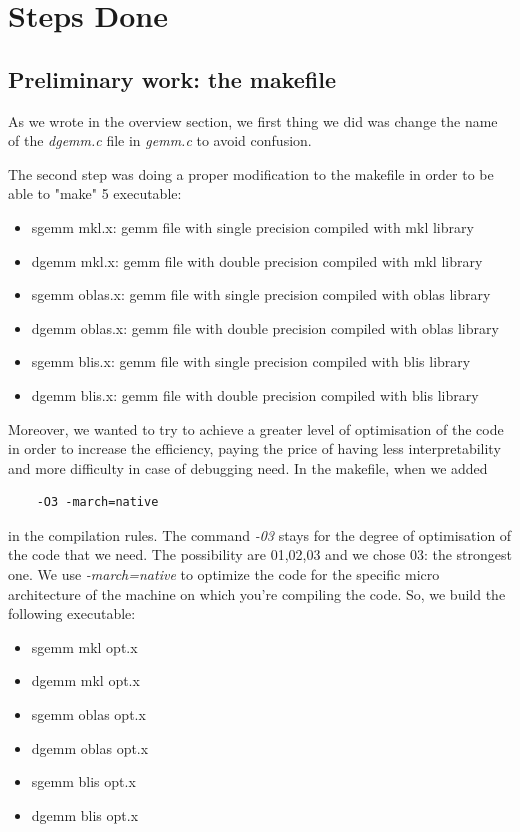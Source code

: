 \documentclass[12pt, titlepage]{report}
\begin{document}
\section{Steps Done}
\subsection{Preliminary work: the makefile}
As we wrote in the overview section, we first thing we did was change the name of the \textit{dgemm.c} file in \textit{gemm.c} to avoid confusion.

The second step was doing a proper modification to the makefile in order to be able to "make" 5 executable:
\begin{itemize}
    \item sgemm mkl.x: gemm file with single precision compiled with mkl library 
    \item dgemm mkl.x: gemm file with double precision compiled with mkl library
    \item sgemm oblas.x: gemm file with single precision compiled with oblas library
    \item dgemm oblas.x: gemm file with double precision compiled with oblas library
    \item sgemm blis.x: gemm file with single precision compiled with blis library
    \item dgemm blis.x: gemm file with double precision compiled with blis library
\end{itemize}

Moreover, we wanted to try to achieve a greater level of optimisation of the code in order to increase the efficiency, paying the price of having less interpretability and more difficulty in case of debugging need.  
In the makefile, when we added
\begin{verbatim}
    -O3 -march=native
\end{verbatim}
in the compilation rules. The command \textit{-03} stays for the degree of optimisation of the code that we need. The possibility are 01,02,03 and we chose 03: the strongest one. We use \textit{-march=native} to optimize the code for the specific micro architecture of the machine on which you're compiling the code.
So, we build the following executable:
\begin{itemize}
    \item sgemm mkl opt.x
    \item dgemm mkl opt.x 
    \item sgemm oblas opt.x 
    \item dgemm oblas opt.x 
    \item sgemm blis opt.x 
    \item dgemm blis opt.x 
\end{itemize}
\end{document}
